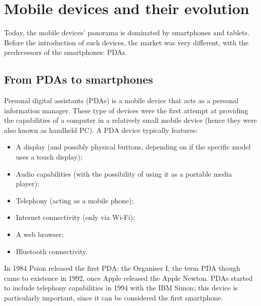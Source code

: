 \section{Mobile devices and their evolution}
Today, the mobile devices' panorama is dominated by smartphones and tablets. Before the introduction of such devices, the market was very different, with the predecessors of the smartphones: PDAs.

\subsection{From PDAs to smartphones}
Personal digital assistants (PDAs) is a mobile device that acts as a personal information manager. These type of devices were the first attempt at providing the capabilities of a computer in a relatively small mobile device (hence they were also known as handheld PC). A PDA device typically features:
\begin{itemize}
    \item A display (and possibly physical buttons, depending on if the specific model uses a touch display);
    \item Audio capabilities (with the possibility of using it as a portable media player);
    \item Telephony (acting as a mobile phone);
    \item Internet connectivity (only via Wi-Fi);
    \item A web browser;
    \item Bluetooth connectivity.
\end{itemize}

In 1984 Psion released the first PDA: the Organiser I; the term PDA though came to existence in 1992, once Apple released the Apple Newton. PDAs started to include telephony capabilities in 1994 with the IBM Simon; this device is particularly important, since it can be considered the first smartphone.
\vspace{5mm}

